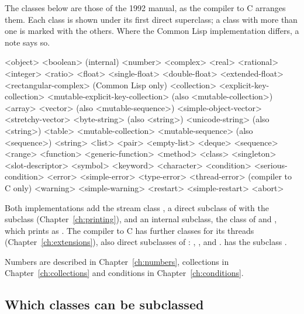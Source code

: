 The classes below are those of the 1992 manual, as the compiler to C
arranges them. Each class is shown under its first direct superclass; a
class with more than one is marked with the others. Where the Common Lisp
implementation differs, a note says so.

\begin{dylan}
<object>
  <boolean>                          (internal)
  <number>
    <complex>
      <real>
        <rational>
          <integer>
          <ratio>
        <float>
          <single-float>
          <double-float>
          <extended-float>
      <rectangular-complex>          (Common Lisp only)
  <collection>
    <explicit-key-collection>
      <mutable-explicit-key-collection>   (also <mutable-collection>)
        <array>
          <vector>                   (also <mutable-sequence>)
            <simple-object-vector>
            <stretchy-vector>
            <byte-string>            (also <string>)
            <unicode-string>         (also <string>)
        <table>
    <mutable-collection>
      <mutable-sequence>             (also <sequence>)
        <string>
        <list>
          <pair>
          <empty-list>
        <deque>
    <sequence>
      <range>
  <function>
    <generic-function>
    <method>
  <class>
  <singleton>
  <slot-descriptor>
  <symbol>
  <keyword>
  <character>
  <condition>
    <serious-condition>
      <error>
        <simple-error>
        <type-error>
        <thread-error>               (compiler to C only)
    <warning>
      <simple-warning>
    <restart>
      <simple-restart>
      <abort>
\end{dylan}

\noindent Both implementations add the stream class ,
a direct subclass of  with the subclass
 (Chapter~\ref{ch:printing}), and an internal
subclass, the class of  and
, which prints as
. The compiler to C
has further classes for its threads (Chapter~\ref{ch:extensions}), also
direct subclasses of : , ,
 and . 
has the subclass .

Numbers are described in Chapter~\ref{ch:numbers}, collections in
Chapter~\ref{ch:collections} and conditions in Chapter~\ref{ch:conditions}.

\subsection{Which classes can be subclassed}

